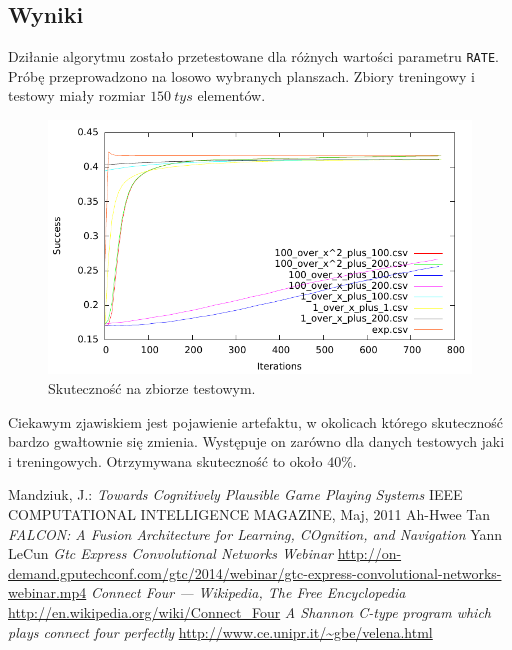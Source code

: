 \documentclass{llncs}
\begin{document}
\subsection{Wyniki}
Dziłanie algorytmu zostało przetestowane dla różnych wartości parametru \texttt{RATE}. Próbę przeprowadzono na 
losowo wybranych planszach. Zbiory treningowy i testowy miały rozmiar $150~tys$ elementów.

\begin{figure}[H]
	\centering	
	\includegraphics[width=\textwidth]{img/test}	\caption{Skuteczność na zbiorze testowym.}
	\label{fig:Siec}
\end{figure}

Ciekawym zjawiskiem jest pojawienie artefaktu, w okolicach którego skuteczność bardzo gwałtownie się zmienia.
Występuje on zarówno dla danych testowych jaki i treningowych.
Otrzymywana skuteczność to około $40\%$.



%
%
\begin{thebibliography}{4}
%
Mandziuk, J.:
\textsl{Towards Cognitively Plausible Game Playing Systems}
IEEE COMPUTATIONAL INTELLIGENCE MAGAZINE, Maj, 2011
Ah-Hwee Tan
\textsl{FALCON: A Fusion Architecture for Learning, COgnition, and Navigation}
Yann LeCun
\textsl{Gtc Express Convolutional Networks Webinar}
\url{http://on-demand.gputechconf.com/gtc/2014/webinar/gtc-express-convolutional-networks-webinar.mp4}
\textsl{Connect Four --- {W}ikipedia{,} The Free Encyclopedia}
\url{http://en.wikipedia.org/wiki/Connect_Four}
\textsl{A Shannon C-type program which plays connect four perfectly}
\url{http://www.ce.unipr.it/~gbe/velena.html}
\end{thebibliography}
\end{document}
